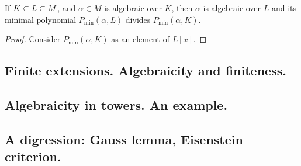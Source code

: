 \begin{prop}
If $K \subset L \subset M$, and $\alpha \in M$ is algebraic over $K$, then $\alpha$ is algebraic over $L$ and its minimal polynomial $P_{\min}(\alpha, L)$ divides $P_{\min}(\alpha, K)$.
\begin{proof}
Consider $P_{\min}(\alpha, K)$ as an element of $L[x]$.
\end{proof}
\end{prop}

\subsection{Finite extensions. Algebraicity and finiteness.}

\subsection{Algebraicity in towers. An example.}

\subsection{A digression: Gauss lemma, Eisenstein criterion.}